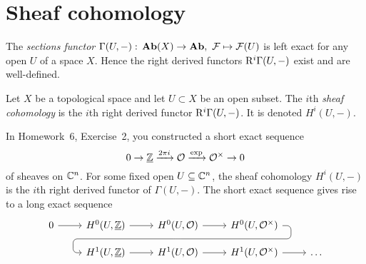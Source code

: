 \section{Sheaf cohomology}

The \emph{sections functor} \(\Gamma(U,-)\colon\catAbelianSheaf(X)\to\catAbelianGroup,\ \mathcal F\mapsto\mathcal F(U)\) is left exact for any open \(U\) of a space \(X\).
Hence the right derived functors \(\mathrm{R}^i\Gamma(U,-)\) exist and are well-defined.

\begin{defn}
	Let $X$ be a topological space and let $U \subset X$ be an open subset. 
	The $i$th \emph{sheaf cohomology}  is the \(i\)th right derived functor $\mathrm{R}^i \Gamma(U, -)$. It is denoted $H^i(U, -)$.
\end{defn}

\begin{exmp}
In Homework~6, Exercise~2, you constructed a short exact sequence
\[ 0\to\underline{\mathbb{Z}}\xrightarrow{2\pi i}\mathcal O\xrightarrow{\exp}\mathcal O^\times\to 0 \]
of sheaves on \(\mathbb{C}^n\).
For some fixed open \(U\subseteq\mathbb{C}^n\), the sheaf cohomology \(H^i(U,-)\) is the \(i\)th right derived functor of \(\Gamma(U,-)\).
The short exact sequence gives rise to a long exact sequence
        \[\begin{tikzcd}[row sep=small]
            0 \ar[r] & H^0(U, \underline{\bb Z}) \ar[r] & H^0(U, \mathcal O) \ar[r] \ar[draw=none]{d}[name=X, anchor=center]{} & H^0(U, \mathcal O^\times)
            \ar[rounded corners,
            to path={ -- ([xshift=2ex]\tikztostart.east)
                      |- (X.center) \tikztonodes
                      -| ([xshift=-2ex]\tikztotarget.west)
                      -- (\tikztotarget)}]{dll}[at end]{} \\
            & H^1(U, \underline{\bb Z}) \ar[r] & H^1(U, \mathcal O) \ar[r] & H^1(U, \mathcal O^\times) \ar[r] & \ldots
        \end{tikzcd}\]
\end{exmp}


